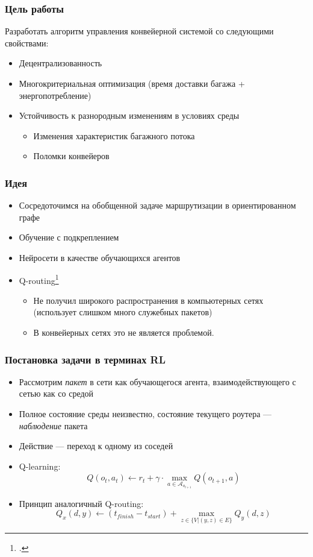 \documentclass{beamer}
\begin{document}

\begin{frame}
  \frametitle{Цель работы}
  Разработать алгоритм управления конвейерной системой со следующими свойствами:
  \begin{itemize}
  \item Децентрализованность
  \item Многокритериальная оптимизация (время доставки багажа +
    энергопотребление)
  \item Устойчивость к разнородным изменениям в условиях среды
    \begin{itemize}
    \item Изменения характеристик багажного потока
    \item Поломки конвейеров
    \end{itemize}
  \end{itemize}
\end{frame}


\begin{frame}
  \frametitle{Идея}
  \begin{itemize}
  \item Сосредоточимся на обобщенной задаче маршрутизации в ориентированном графе
  \item Обучение с подкреплением
  \item Нейросети в качестве обучающихся агентов
  \item Q-routing\footcite{q-routing-orig}
    \begin{itemize}
    \item Не получил широкого распространения в компьютерных сетях (использует
      слишком много служебных пакетов)
    \item В конвейерных сетях это не является проблемой.
    \end{itemize}
  \end{itemize}
\end{frame}


\begin{frame}
  \frametitle{Постановка задачи в терминах RL}
  \begin{itemize}
    \item Рассмотрим \textit{пакет} в сети как обучающегося агента,
      взаимодействующего с сетью как со средой
    \item Полное состояние среды неизвестно, состояние текущего роутера ---
      \textit{наблюдение} пакета
    \item Действие --- переход к одному из соседей
    \item Q-learning:
      \[
      Q(o_t, a_t) \leftarrow r_t + \gamma \cdot
      \max\limits_{a \in \mathcal{A}_{o_{t+1}}} {Q(o_{t+1}, a)}
      \]
    \item Принцип аналогичный Q-routing:
      \[
      Q_x(d, y) \leftarrow (t_{finish} - t_{start}) +
      \max\limits_{z \in \{ V | (y, z) \in E\}} {Q_y(d, z)}
      \]
  \end{itemize}
\end{frame}
\end{document}
